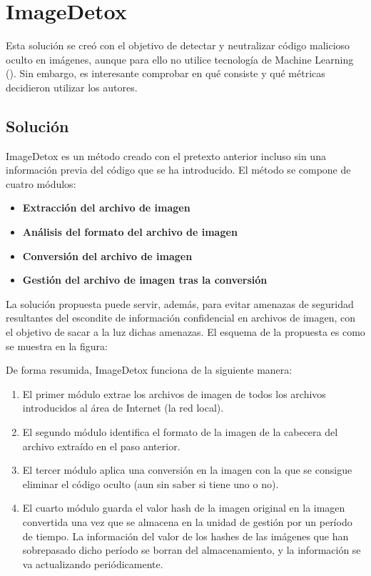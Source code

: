 \section{ImageDetox}

Esta solución se creó con el objetivo de detectar y neutralizar código malicioso oculto en imágenes, aunque para ello no utilice tecnología de Machine Learning (\cite{imagedetox}). Sin embargo, es interesante comprobar en qué consiste y qué métricas decidieron utilizar los autores. %

\subsection{Solución}

ImageDetox es un método creado con el pretexto anterior incluso sin una información previa del código que se ha introducido. El método se compone de cuatro módulos:

\begin{itemize}
\item \textbf{Extracción del archivo de imagen}
\item \textbf{Análisis del formato del archivo de imagen}
\item \textbf{Conversión del archivo de imagen}
\item \textbf{Gestión del archivo de imagen tras la conversión}
\end{itemize}

La solución propuesta puede servir, además, para evitar amenazas de seguridad resultantes del escondite de información confidencial en archivos de imagen, con el objetivo de sacar a la luz dichas amenazas. El esquema de la propuesta es como se muestra en la figura:


De forma resumida, ImageDetox funciona de la siguiente manera:
\begin{enumerate}
\item  El primer módulo extrae los archivos de imagen de todos los archivos introducidos al área de Internet (la red local).
\item El segundo módulo identifica el formato de la imagen de la cabecera del archivo extraído en el paso anterior.
\item El tercer módulo aplica una conversión en la imagen con la que se consigue eliminar el código oculto (aun sin saber si tiene uno o no).
\item El cuarto módulo guarda el valor hash de la imagen original en la imagen convertida una vez que se almacena en la unidad de gestión por un período de tiempo. La información del valor de los hashes de las imágenes que han sobrepasado dicho período se borran del almacenamiento, y la información se va  actualizando periódicamente.
\end{enumerate}

